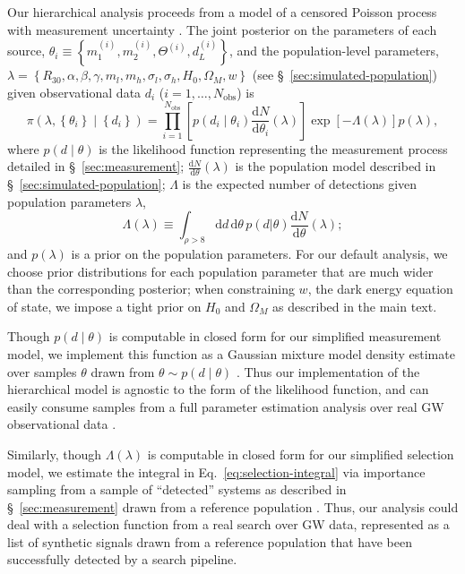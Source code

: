 \documentclass[modern]{aastex62}
\newcommand{\dd}{\mathrm{d}}
\newcommand{\diff}[2]{\frac{\dd #1}{\dd #2}}
\begin{document}
Our hierarchical analysis proceeds from a model of a censored Poisson process
with measurement uncertainty \citep{Loredo2004,Mandel2019}.  The joint posterior
on the parameters of each source, $\theta_i \equiv \left\{ m_1^{(i)}, m_2^{(i)},
\Theta^{(i)}, d_L^{(i)} \right\}$, and the population-level parameters, $\lambda
= \left\{ R_{30}, \alpha, \beta, \gamma, m_l, m_h, \sigma_l, \sigma_h, H_0,
\Omega_M, w \right\}$ (see \S\ \ref{sec:simulated-population}) given
observational data $d_i$ ($i = 1, \ldots, N_\mathrm{obs}$) is
%
\begin{equation}
  \label{eq:hierarchical-model}
  \pi \left( \lambda, \left\{ \theta_i \right\} \mid \left\{ d_i \right\} \right) = \prod_{i=1}^{N_\mathrm{obs}} \left[ p\left( d_i \mid \theta_i \right) \diff{N}{\theta_i}(\lambda) \right] \exp\left[ - \Lambda(\lambda) \right] p\left( \lambda \right),
\end{equation}
%
where $p\left( d \mid \theta \right)$ is the likelihood function representing
the measurement process detailed in \S\ \ref{sec:measurement};
$\diff{N}{\theta}(\lambda)$ is the population model described in \S\
\ref{sec:simulated-population}; $\Lambda$ is the expected number of detections
given population parameters $\lambda$,
%
\begin{equation}
  \label{eq:selection-integral}
  \Lambda(\lambda) \equiv \int_{\rho > 8} \dd d \, \dd \theta \, p\left( d | \theta \right) \diff{N}{\theta}\left(\lambda \right);
\end{equation}
%
and $p(\lambda)$ is a prior on the population parameters.  For our default
analysis, we choose prior distributions for each population parameter that are
much wider than the corresponding posterior; when constraining $w$, the dark
energy equation of state, we impose a tight prior on $H_0$ and $\Omega_M$ as
described in the main text.

Though $p\left( d \mid \theta \right)$ is computable in closed form for our
simplified measurement model, we implement this function as a Gaussian mixture
model density estimate over samples $\theta$ drawn from $\theta \sim p\left( d
\mid \theta \right)$ \citep{SciKitLearn}.  Thus our implementation of the
hierarchical model is agnostic to the form of the likelihood function, and can
easily consume samples from a full parameter estimation analysis over real
\ac{GW} observational data \citep{GWTC-1}.

Similarly, though $\Lambda(\lambda)$ is computable in closed form for our
simplified selection model, we estimate the integral in Eq.\
\eqref{eq:selection-integral} via importance sampling from a sample of
``detected'' systems as described in \S\ \ref{sec:measurement} drawn from a
reference population \citep{Farr2019}.  Thus, our analysis could deal with a
selection function from a real search over \ac{GW} data, represented as a list
of synthetic signals drawn from a reference population that have been
successfully detected by a search pipeline.
\end{document}
